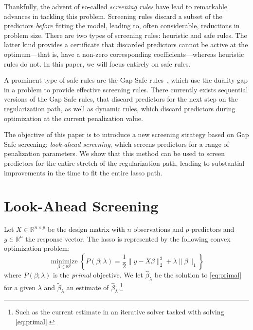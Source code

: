 \documentclass[b5paper,10pt,abstractoff,DIV=calc,headings=normal,twoside]{scrartcl}
\theoremstyle{plain}
\theoremstyle{definition}
\theoremstyle{remark}
\begin{document}
Thankfully, the advent of so-called \emph{screening rules} have lead to
remarkable advances in tackling this problem. Screening rules discard a
subset of the predictors \emph{before} fitting the model, leading to, often
considerable, reductions in problem size. There are two types of screening
rules: heuristic and safe rules.
The latter kind provides a certificate that discarded predictors cannot be
active at the optimum---that is, have a non-zero corresponding
coefficients---whereas heuristic rules do not. In this paper, we will
focus entirely on safe rules.

A prominent type of safe rules are the Gap Safe
rules~\citep{ndiaye2017,fercoq2015}, which use the duality gap in a problem
to provide effective screening rules. There currently exists
sequential versions of
the Gap Safe rules, that discard predictors for the next step on the
regularization path, as well as dynamic rules, which discard predictors
during optimization at the current penalization value.

The objective of this paper is to introduce a new screening strategy based
on Gap Safe screening: \emph{look-ahead screening}, which
screens predictors for a range of penalization parameters. We
show that this method can be used to screen predictors for the entire
stretch of the regularization path, leading to substantial improvements in
the time to fit the entire lasso path.

\section{Look-Ahead Screening}%
\label{sec:look-ahead-screening}

Let \(X \in \mathbb{R}^{n \times p}\) be the design matrix with \(n\)
observations and \(p\) predictors
and \(y \in \mathbb{R}^n\) the response vector.
The lasso is represented by the following convex optimization problem:
\begin{equation}
  \label{eq:primal}
  \operatorname*{minimize}_{\beta \in \mathbb{R}^p} \left\{P(\beta; \lambda)
  = \frac 1 2 \lVert y - X\beta \rVert_2^2 + \lambda \lVert \beta \rVert_1\right\}
\end{equation}
where \(P(\beta;\lambda)\)
is the \emph{primal} objective. We let \(\hat \beta_\lambda\) be the solution to
\eqref{eq:primal} for a given \(\lambda\) and \(\tilde
\beta_\lambda\) an estimate of \(\hat\beta_\lambda\).\footnote{Such as
  the current estimate in an iterative solver tasked with solving
  \eqref{eq:primal}.}
\end{document}
